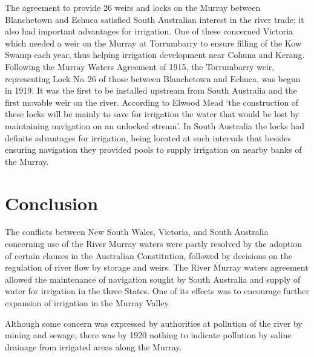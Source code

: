 The agreement to provide 26 weirs and locks on the Murray between
Blanche\-town and Echuca satisfied South Australian interest in the
river trade; it also had important advantages for irrigation.  One of
these concerned Victoria which needed a weir on the Murray at
Torrumbarry to ensure filling of the Kow Swamp each year, thus helping
irrigation development near Cohuna and Kerang. Following the Murray
Waters Agreement of 1915, the Torrumbarry weir, representing Lock
No.\,26 of those between Blanchetown and Echuca, was begun in 1919. It
was the first to be installed upstream from South Australia and the
first movable weir on the river.  According to Elwood Mead `the
construction of these locks will be mainly to save for irrigation the
water that would be lost by maintaining navigation on an unlocked
stream'.  In South Australia the locks had definite advantages for
irrigation, being located at such intervals that besides ensuring
navigation they provided pools to supply irrigation on nearby banks of
the Murray.

\section*{Conclusion}

The conflicts between New South Wales, Victoria, and South Australia
concerning use of the River Murray waters were partly resolved by the
adoption of certain clauses in the Australian Constitution, followed
by decisions on the regulation of river flow by storage and weirs.
The River Murray waters agreement allowed the maintenance of
navigation sought by South Australia and supply of water for
irrigation in the three States.  One of its effects was to encourage
further expansion of irrigation in the Murray Valley.

Although some concern was expressed by authorities at pollution of the
river by mining and sewage, there was by 1920 nothing to indicate
pollution by saline drainage from irrigated areas along the Murray.

